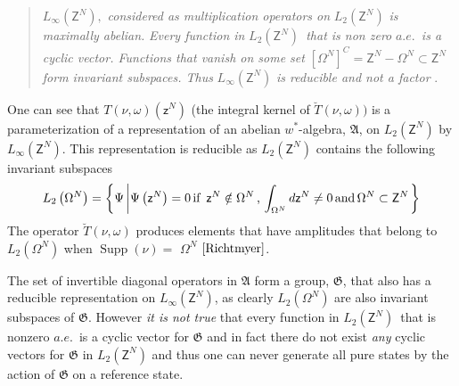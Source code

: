 \documentclass[aps,preprint]{revtex4}%
\begin{document}
\begin{quotation}
$L_{\infty}\left(  \mathsf{Z}^{N}\right)  ,$ \textit{considered as
multiplication operators on} $L_{2}\left(  \mathsf{Z}^{N}\right)  $ \textit{is
maximally abelian. }\emph{Every function in }$L_{2}\left(  \mathsf{Z}%
^{N}\right)  $\emph{\ that is non zero }$a.e.$\emph{\ is a cyclic
vector}\textit{. Functions that vanish on some set} $\left[  \Omega
^{N}\right]  ^{C}=\mathsf{Z}^{N}-\Omega^{N}\subset\mathsf{Z}^{N}$ \textit{form
invariant subspaces. Thus} $L_{\infty}\left(  \mathsf{Z}^{N}\right)  $
\textit{is reducible and not a factor }\cite{Encyclo}.
\end{quotation}

One can see that $T\left(  \nu,\omega\right)  \left(  \mathsf{z}^{N}\right)  $
(the integral kernel of $\breve{T}\left(  \nu,\omega\right)  )$ is a
parameterization of a representation of an abelian $w^{\ast}$-algebra,
$\mathfrak{A}$, on $L_{2}\left(  \mathsf{Z}^{N}\right)  $ by $L_{\infty
}\left(  \mathsf{Z}^{N}\right)  $. This representation is reducible as
$L_{2}\left(  \mathsf{Z}^{N}\right)  $ contains the following invariant
subspaces
\begin{equation}
L_{2}\left(  \Omega^{N}\right)  =\left\{  \Psi\left\vert \Psi\left(
\mathsf{z}^{N}\right)  =0\,\text{if \thinspace}\mathsf{z}^{N}\notin\Omega
^{N}\,\text{,\thinspace}\int_{\Omega^{N}}d\mathsf{z}^{N}\neq
0\,\text{and\thinspace}\Omega^{N}\subset\mathsf{Z}^{N}\right.  \right\}
\end{equation}
The operator $\breve{T}\left(  \nu,\omega\right)  $ produces elements that
have amplitudes that belong to $L_{2}\left(  \Omega^{N}\right)  $ when
$\operatorname{Supp}\left(  \nu\right)  =$ $\Omega^{N}$ $\cite{Richtmyer}$.

The set of invertible diagonal operators in $\mathfrak{A}$ form a group,
$\mathfrak{G}$, that also has a reducible representation on $L_{\infty}\left(
\mathsf{Z}^{N}\right)  $, as clearly $L_{2}\left(  \Omega^{N}\right)  $ are
also invariant subspaces of $\mathfrak{G}$. However \emph{it is not true} that
every function in $L_{2}\left(  \mathsf{Z}^{N}\right)  $\ that is nonzero
$a.e.$\ is a cyclic vector for $\mathfrak{G}$ and in fact there do not exist
\emph{any} cyclic vectors for $\mathfrak{G}$ in $L_{2}\left(  \mathsf{Z}%
^{N}\right)  $ and thus one can never generate all pure states by the action
of $\mathfrak{G}$ on a reference state.
\end{document}
